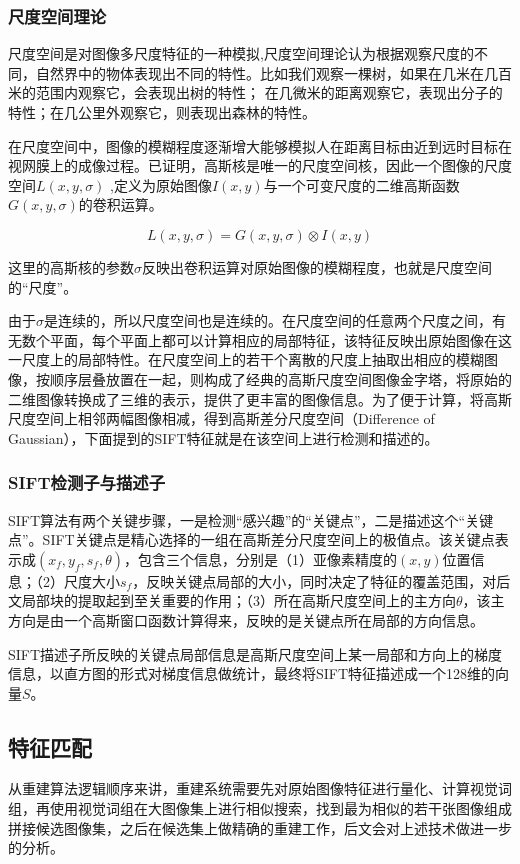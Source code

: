 \documentclass[UTF8]{csoarticle}
\begin{document}
\subsubsection{尺度空间理论}
尺度空间是对图像多尺度特征的一种模拟,尺度空间理论认为根据观察尺度的不同，自然界中的物体表现出不同的特性。比如我们观察一棵树，如果在几米在几百米的范围内观察它，会表现出树的特性； 在几微米的距离观察它，表现出分子的特性；在几公里外观察它，则表现出森林的特性。

在尺度空间中，图像的模糊程度逐渐增大能够模拟人在距离目标由近到远时目标在视网膜上的成像过程。已证明，高斯核是唯一的尺度空间核，因此一个图像的尺度空间\(L(x,y,\sigma)\) ,定义为原始图像\(I(x,y)\)与一个可变尺度的二维高斯函数\(G(x,y,\sigma)\)的卷积运算。

\begin{equation}
  L(x,y,\sigma) = G(x,y,\sigma) \otimes I(x,y)
\end{equation}

这里的高斯核的参数\(\sigma\)反映出卷积运算对原始图像的模糊程度，也就是尺度空间的“尺度”。

由于\(\sigma\)是连续的，所以尺度空间也是连续的。在尺度空间的任意两个尺度之间，有无数个平面，每个平面上都可以计算相应的局部特征，该特征反映出原始图像在这一尺度上的局部特性。在尺度空间上的若干个离散的尺度上抽取出相应的模糊图像，按顺序层叠放置在一起，则构成了经典的高斯尺度空间图像金字塔，将原始的二维图像转换成了三维的表示，提供了更丰富的图像信息。为了便于计算，将高斯尺度空间上相邻两幅图像相减，得到高斯差分尺度空间（Difference of Gaussian），下面提到的SIFT特征就是在该空间上进行检测和描述的。

\subsubsection{SIFT检测子与描述子}
SIFT算法有两个关键步骤，一是检测“感兴趣”的“关键点”，二是描述这个“关键点”。SIFT关键点是精心选择的一组在高斯差分尺度空间上的极值点。该关键点表示成\((x_f,y_f,s_f,\theta)\)，包含三个信息，分别是（1）亚像素精度的\((x,y)\)位置信息；（2）尺度大小\(s_f\)，反映关键点局部的大小，同时决定了特征的覆盖范围，对后文局部块的提取起到至关重要的作用；（3）所在高斯尺度空间上的主方向\(\theta\)，该主方向是由一个高斯窗口函数计算得来，反映的是关键点所在局部的方向信息。

SIFT描述子所反映的关键点局部信息是高斯尺度空间上某一局部和方向上的梯度信息，以直方图的形式对梯度信息做统计，最终将SIFT特征描述成一个128维的向量\(S\)。

\subsection{特征匹配}
从重建算法逻辑顺序来讲，重建系统需要先对原始图像特征进行量化、计算视觉词组，再使用视觉词组在大图像集上进行相似搜索，找到最为相似的若干张图像组成拼接候选图像集，之后在候选集上做精确的重建工作，后文会对上述技术做进一步的分析。
\end{document}
